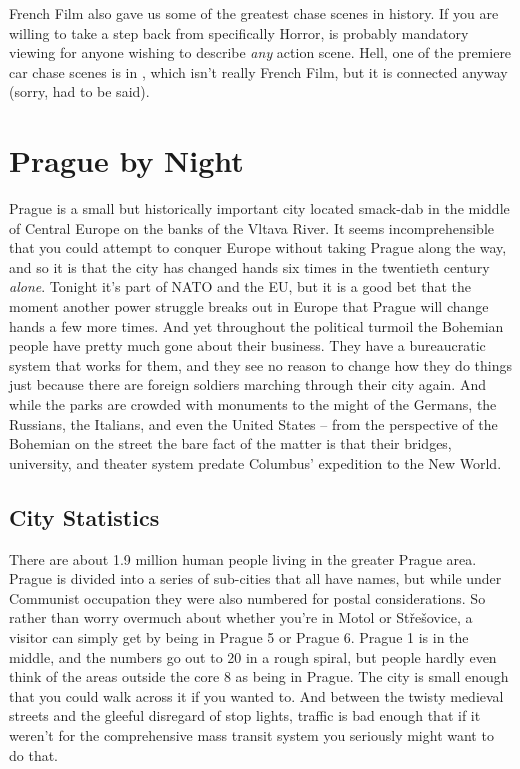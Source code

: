 French Film also gave us some of the greatest chase scenes in history. If you are willing to take a step back from specifically Horror,  is probably mandatory viewing for anyone wishing to describe \textit{any} action scene. Hell, one of the premiere car chase scenes is in , which isn't really French Film, but it is connected anyway (sorry, had to be said).

\section{Prague by Night}

Prague is a small but historically important city located smack-dab in the middle of Central Europe on the banks of the Vltava River. It seems incomprehensible that you could attempt to conquer Europe without taking Prague along the way, and so it is that the city has changed hands six times in the twentieth century \textit{alone}. Tonight it's part of NATO and the EU, but it is a good bet that the moment another power struggle breaks out in Europe that Prague will change hands a few more times. And yet throughout the political turmoil the Bohemian people have pretty much gone about their business. They have a bureaucratic system that works for them, and they see no reason to change how they do things just because there are foreign soldiers marching through their city again. And while the parks are crowded with monuments to the might of the Germans, the Russians, the Italians, and even the United States -- from the perspective of the Bohemian on the street the bare fact of the matter is that their bridges, university, and theater system predate Columbus' expedition to the New World.

\subsection{City Statistics}

\hspace{\parindent} There are about 1.9 million human people living in the greater Prague area. Prague is divided into a series of sub-cities that all have names, but while under Communist occupation they were also numbered for postal considerations. So rather than worry overmuch about whether you're in Motol or St\v{r}e\v{s}ovice, a visitor can simply get by being in Prague 5 or Prague 6. Prague 1 is in the middle, and the numbers go out to 20 in a rough spiral, but people hardly even think of the areas outside the core 8 as being in Prague. The city is small enough that you could walk across it if you wanted to. And between the twisty medieval streets and the gleeful disregard of stop lights, traffic is bad enough that if it weren't for the comprehensive mass transit system you seriously might want to do that.

